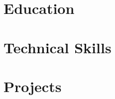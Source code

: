 \documentclass[11pt]{article}
\begin{document}
\section*{\selectfont Education}



\section*{\selectfont Technical Skills} 


\section*{\selectfont Projects} 
 

% 
 

%




%
% 

% 
\end{document}
